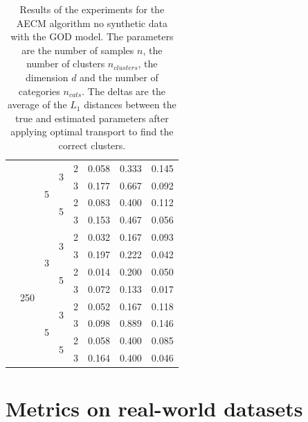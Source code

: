 \documentclass[a4paper,12pt]{article}
\begin{document}
\begin{table}[H]
\begin{minipage}{.48\columnwidth}
\begin{adjustbox}{width=\columnwidth}
\begin{tabular}{lllllrrr}
\cline{3-8} \cline{4-8}
 &  & \multirow[t]{4}{*}{5} & \multirow[t]{2}{*}{3} & 2 & 0.058 & 0.333 & 0.145 \\
 &  &  &  & 3 & 0.177 & 0.667 & 0.092 \\
\cline{4-8}
 &  &  & \multirow[t]{2}{*}{5} & 2 & 0.083 & 0.400 & 0.112 \\
 &  &  &  & 3 & 0.153 & 0.467 & 0.056 \\
\cline{2-8} \cline{3-8} \cline{4-8}
 & \multirow[t]{8}{*}{250} & \multirow[t]{4}{*}{3} & \multirow[t]{2}{*}{3} & 2 & 0.032 & 0.167 & 0.093 \\
 &  &  &  & 3 & 0.197 & 0.222 & 0.042 \\
\cline{4-8}
 &  &  & \multirow[t]{2}{*}{5} & 2 & 0.014 & 0.200 & 0.050 \\
 &  &  &  & 3 & 0.072 & 0.133 & 0.017 \\
\cline{3-8} \cline{4-8}
 &  & \multirow[t]{4}{*}{5} & \multirow[t]{2}{*}{3} & 2 & 0.052 & 0.167 & 0.118 \\
 &  &  &  & 3 & 0.098 & 0.889 & 0.146 \\
\cline{4-8}
 &  &  & \multirow[t]{2}{*}{5} & 2 & 0.058 & 0.400 & 0.085 \\
 &  &  &  & 3 & 0.164 & 0.400 & 0.046 \\
\cline{1-8} \cline{2-8} \cline{3-8} \cline{4-8}
\bottomrule
\end{tabular}
\end{adjustbox}
\caption{Results of the experiments for the AECM algorithm no synthetic data with the GOD model. The parameters are the number of samples $n$, the number of clusters $n_{clusters}$, the dimension $d$ and the number of categories $n_{cats}$. The deltas are the average of the $L_1$ distances between the true and estimated parameters after applying optimal transport to find the correct clusters.}
\label{tab:results_god}
\end{minipage}
\end{table}

\section{Metrics on real-world datasets}
\label{appendix:metrics_real}
\end{document}
